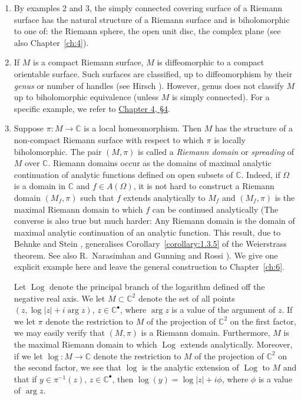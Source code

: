 \begin{enumerate}
\item By examples 2 and 3, the simply connected covering surface of a Riemann surface has the natural structure of a Riemann surface and is biholomorphic to one of: the Riemann sphere, the open unit disc, the complex plane (see also Chapter~\ref{ch:4}).

\item If $M$ is a compact Riemann surface, $M$ is diffeomorphic to a compact orientable surface. Such surfaces are classified, up to diffeomorphism by their \emph{genus} or number of handles (see Hirsch \cite{bib:I:hirsch-m-w:1}). However, genus does not classify $M$ up to biholomorphic equivalence (unless $M$ is simply connected). For a specific example, we refer to \hyperref[sec:4:4]{Chapter 4, \S4}.

\item Suppose $\pi:M\to\mathbb C$ is a local homeomorphism. Then $M$ has the structure of a non-compact Riemann surface with respect to which $\pi$ is locally biholomorphic. The pair $(M,\pi)$ is called a \emph{Riemann domain} or \emph{spreading} of $M$ over $\mathbb C$. Riemann domains occur as the domains of maximal analytic continuation of analytic functions defined on open subsets of $\mathbb C$. Indeed, if $\Omega$ is a domain in $\mathbb C$ and $f\in A(\Omega)$, it is not hard to construct a Riemann domain $(M_f,\pi)$ such that $f$ extends analytically to $M_f$ and $(M_f,\pi)$ is the maximal Riemann domain to which $f$ can be continued analytically (The converse is also true but much harder: Any Riemann domain is the domain of maximal analytic continuation of an analytic function. This result, due to Behnke and Stein \cite{bib:I:behnke-h-and-stein-k:1}, generalises Corollary~\ref{corollary:1.3.5} of the Weierstrass theorem. See also R.~Narasimhan \cite{bib:I:narasimhan-r:1} and Gunning and Rossi \cite{bib:I:gunning-r-c-and-rossi-h:1}). We give one explicit example here and leave the general construction to Chapter~\ref{ch:6}.

Let $\operatorname{Log}$ denote the principal branch of the logarithm defined off the negative real axis. We let $M\subset\mathbb C^2$ denote the set of all points $(z,\log|z|+i\arg z)$, $z\in\mathbb C^\bullet$, where $\arg z$ is a value of the argument of $z$. If we let $\pi$ denote the restriction to $M$ of the projection of $\mathbb C^2$ on the first factor, we may easily verify that $(M,\pi)$ is a Riemann domain. Furthermore, $M$ is the maximal Riemann domain to which $\operatorname{Log}$ extends analytically. Moreover, if we let $\log:M\to\mathbb C$ denote the restriction to $M$ of
the projection of $\mathbb C^2$ on the second factor, we see that $\log$ is the analytic extension of $\operatorname{Log}$ to $M$ and that if $y\in\pi^{-1}(z)$, $z\in\mathbb C^\bullet$, then $\log(y)=\log|z|+i\phi$, where $\phi$ is a value of $\arg z$.


\end{enumerate}
